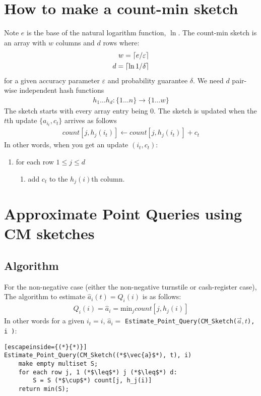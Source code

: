 \documentclass[11pt]{article}
\newcommand{\sq}{\mathit{Q}_i}
\DeclarePairedDelimiter\ceil{\lceil}{\rceil}
\newcommand{\ra}{\rightarrow}
\begin{document}
\section{How to make a count-min sketch}
Note $e$ is the base of the natural logarithm function, $\ln$. The count-min
sketch is an array with $w$ columns and $d$ rows where:
\begin{align}
    w = \ceil{e/\varepsilon}\\
    d = \ceil{\ln{1/\delta}}
\end{align}
for a given accuracy parameter $\varepsilon$ and probability guarantee $\delta$.
We need $d$ pair-wise independent hash functions
\begin{align}
    h_1 \dots h_d : \{1 \dots n\} \ra \{1 \dots w\} 
\end{align}
The sketch starts with every array entry being 0. The sketch is updated when the $t$th update $\{a_{i_t}, c_t\}$
arrives as follows
\begin{align}
    count[j, h_j(i_t)] \leftarrow count[j, h_j(i_t)] + c_t     
\end{align}
In other words, when you get an update $(i_t, c_t)$:
\begin{enumerate}
    \item for each row $1 \leq j \leq d$
    \begin{enumerate}
        \item add $c_t$ to the $h_j(i)$th column.
    \end{enumerate}
\end{enumerate}

\section{Approximate Point Queries using CM sketches}
\subsection{Algorithm}
For the non-negative case (either the non-negative turnstile or cash-register case),
The algorithm to estimate $\hat{a}_i(t) = \sq(i)$ is as follows: \begin{align}
    \sq(i) = \hat{a}_i = \text{min}_j count[j, h_j(i)]
\end{align}
In other words for a given $i_t = i$, $\hat a_i =$ \texttt{Estimate\_Point\_Query(CM\_Sketch($\vec{a}, t$), i )}:

\begin{lstlisting}[escapeinside={(*}{*)}]
Estimate_Point_Query(CM_Sketch((*$\vec{a}$*), t), i) 
    make empty multiset S;
    for each row j, 1 (*$\leq$*) j (*$\leq$*) d:
        S = S (*$\cup$*) count[j, h_j(i)]
    return min(S);
\end{lstlisting}
\end{document}
